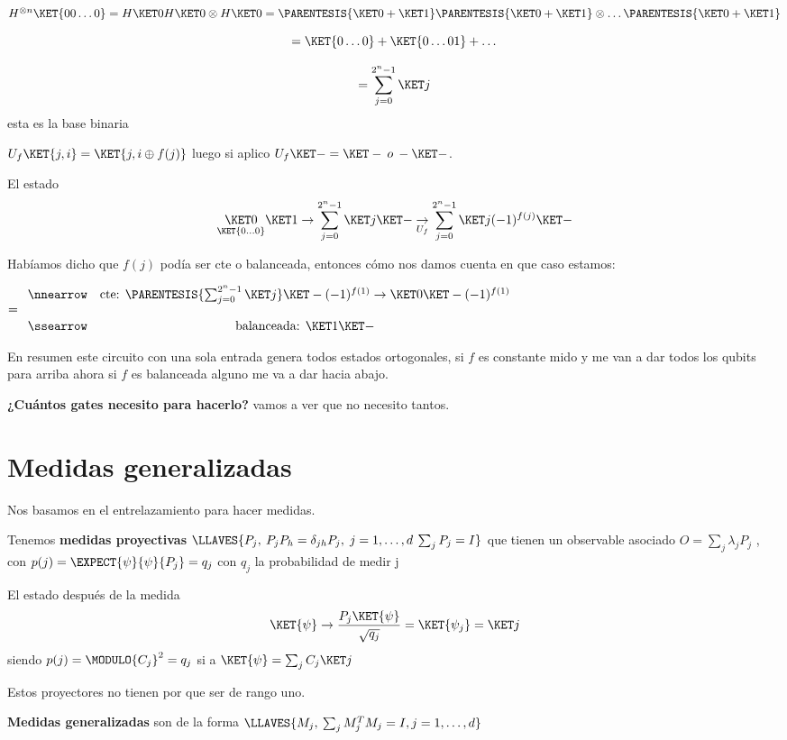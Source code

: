 $H^{\otimes n}\KET{00\dots0}=H\KET 0H\KET 0\otimes H\KET 0=\PARENTESIS{\KET 0+\KET 1}\PARENTESIS{\KET 0+\KET 1}\otimes\dots\PARENTESIS{\KET 0+\KET 1}$

\[
=\KET{0\dots0}+\KET{0\dots01}+\dots
\]

\[
=\sum_{j=0}^{2^{n}-1}\KET j
\]
esta es la base binaria

$U_{f}\KET{j,i}=\KET{j,i\oplus f(j)}$ luego si aplico $U_{f}\KET -=\KET -\:o\:-\KET -$. 

El estado 
\[
\underset{\KET{0\dots0}}{\KET 0}\KET 1\rightarrow\sum_{j=0}^{2^{n}-1}\KET j\KET -\underset{U_{f}}{\rightarrow}\sum_{j=0}^{2^{n}-1}\KET j(-1)^{f(j)}\KET -
\]

Habíamos dicho que $f(j)$ podía ser cte o balanceada, entonces cómo
nos damos cuenta en que caso estamos:

$=\begin{array}{cc}
\nnearrow & \text{cte: }\PARENTESIS{\sum_{j=0}^{2^{n}-1}\KET j}\KET -(-1)^{f(1)}\rightarrow\KET 0\KET -(-1)^{f(1)}\\
\\
\ssearrow & \text{balanceada: }\KET 1\KET -
\end{array}$

En resumen este circuito con una sola entrada genera todos estados
ortogonales, si $f$ es constante mido y me van a dar todos los qubits para
arriba ahora si $f$ es balanceada alguno me va a dar hacia abajo.

\textbf{¿Cuántos gates necesito para hacerlo? }vamos a ver que no
necesito tantos.

\section{Medidas generalizadas}

Nos basamos en el entrelazamiento para hacer medidas.

Tenemos \textbf{medidas proyectivas} $\LLAVES{P_{j},\:P_{j}P_{h}=\delta_{jh}P_{j},\;j=1,\dots,d\:\sum_{j}P_{j}=I}$
que tienen un observable asociado $O=\sum_{j}\lambda_{j}P_{j}$ ,
con $p(j)=\EXPECT{\psi}{\psi}{P_{j}}=q_{j}$ con $q_{j}$ la probabilidad
de medir j

El estado después de la medida 
\[
\KET{\psi}\rightarrow\frac{P_{j}\KET{\psi}}{\sqrt{q_{j}}}=\KET{\psi_{j}}=\KET j
\]
siendo $p(j)=\MODULO{C_{j}}^{2}=q_{j}$ si a $\KET{\psi}=\sum_{j}C_{j}\KET j$

Estos proyectores no tienen por que ser de rango uno.

\textbf{Medidas generalizadas} son de la forma $\LLAVES{M_{j},\:\sum_{j}M_{j}^{T}M_{j}=I,j=1,\dots,d}$


